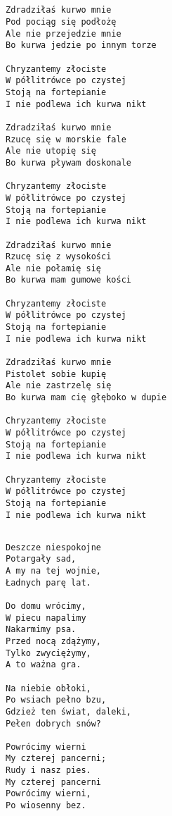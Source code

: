 \documentclass[12pt]{article}
\begin{document}
\subsection*{}
\begin{verbatim}
Zdradziłaś kurwo mnie
Pod pociąg się podłożę
Ale nie przejedzie mnie
Bo kurwa jedzie po innym torze

Chryzantemy złociste
W półlitrówce po czystej
Stoją na fortepianie
I nie podlewa ich kurwa nikt

Zdradziłaś kurwo mnie
Rzucę się w morskie fale
Ale nie utopię się
Bo kurwa pływam doskonale

Chryzantemy złociste
W półlitrówce po czystej
Stoją na fortepianie
I nie podlewa ich kurwa nikt

Zdradziłaś kurwo mnie
Rzucę się z wysokości
Ale nie połamię się
Bo kurwa mam gumowe kości

Chryzantemy złociste
W półlitrówce po czystej
Stoją na fortepianie
I nie podlewa ich kurwa nikt

Zdradziłaś kurwo mnie
Pistolet sobie kupię
Ale nie zastrzelę się
Bo kurwa mam cię głęboko w dupie

Chryzantemy złociste
W półlitrówce po czystej
Stoją na fortepianie
I nie podlewa ich kurwa nikt

Chryzantemy złociste
W półlitrówce po czystej
Stoją na fortepianie
I nie podlewa ich kurwa nikt
\end{verbatim}
\clearpage

\subsection*{}
\begin{verbatim}
Deszcze niespokojne
Potargały sad,
A my na tej wojnie,
Ładnych parę lat.

Do domu wrócimy,
W piecu napalimy
Nakarmimy psa.
Przed nocą zdążymy,
Tylko zwyciężymy,
A to ważna gra.

Na niebie obłoki,
Po wsiach pełno bzu,
Gdzież ten świat, daleki,
Pełen dobrych snów?

Powrócimy wierni
My czterej pancerni;
Rudy i nasz pies.
My czterej pancerni
Powrócimy wierni,
Po wiosenny bez.
\end{verbatim}
\clearpage
\end{document}
